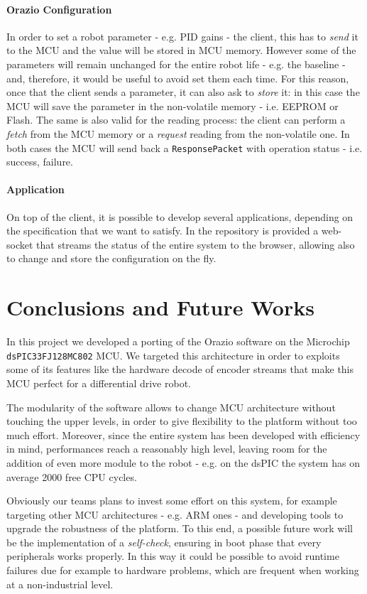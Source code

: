 \documentclass[10pt,a4paper, notitlepage]{report}
\begin{document}
\paragraph{Orazio Configuration} In order to set a robot parameter - e.g. PID gains - the client, this has to \textit{send} it to the MCU and the value will be stored in MCU memory. However some of the parameters will remain unchanged for the entire robot life - e.g. the baseline - and, therefore, it would be useful to avoid set them each time. For this reason, once that the client sends a parameter, it can also ask to \textit{store} it: in this case the MCU will save the parameter in the non-volatile memory - i.e. EEPROM or Flash.
The same is also valid for the reading process: the client can perform a \textit{fetch} from the MCU memory or a \textit{request} reading from the non-volatile one. 
In both cases the MCU will send back a \texttt{ResponsePacket} with operation status - i.e. success, failure.

\paragraph{Application} On top of the client, it is possible to develop several applications, depending on the specification that we want to satisfy. In the repository is provided a web-socket that streams the status of the entire system to the browser, allowing also to change and store the configuration on the fly. 

\section*{Conclusions and Future Works} \label{sec:conclusions}
In this project we developed a porting of the Orazio software on the Microchip \texttt{dsPIC33FJ128MC802} MCU. We targeted this architecture in order to exploits some of its features like the hardware decode of encoder streams that make this MCU perfect for a differential drive robot.

The modularity of the software allows to change MCU architecture without touching the upper levels, in order to give flexibility to the platform without too much effort. Moreover, since the entire system has been developed with efficiency in mind, performances reach a reasonably high level, leaving room for the addition of even more module to the robot - e.g. on the dsPIC the system has on average 2000 free CPU cycles.

Obviously our teams plans to invest some effort on this system, for example targeting other MCU architectures - e.g. ARM ones - and developing tools to upgrade the robustness of the platform. To this end, a possible future work will be the implementation of a \textit{self-check}, ensuring in boot phase that every peripherals works properly. In this way it could be possible to avoid runtime failures due for example to hardware problems, which are frequent when working at a non-industrial level.
\end{document}
